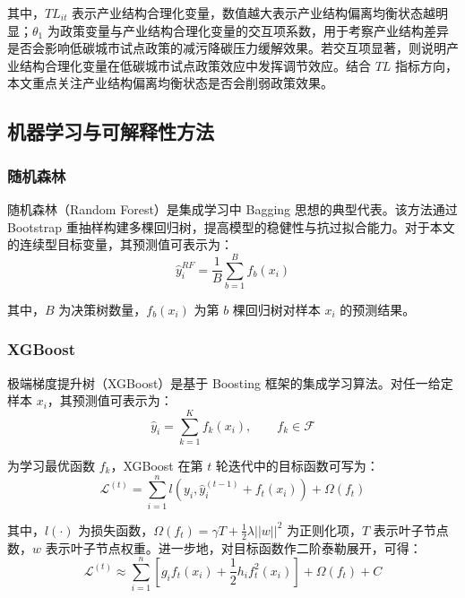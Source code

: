 \documentclass[12pt,a4paper]{ctexart}
\begin{document}
其中，$TL_{it}$ 表示产业结构合理化变量，数值越大表示产业结构偏离均衡状态越明显；$\theta_1$ 为政策变量与产业结构合理化变量的交互项系数，用于考察产业结构差异是否会影响低碳城市试点政策的减污降碳压力缓解效果。若交互项显著，则说明产业结构合理化变量在低碳城市试点政策效应中发挥调节效应。结合 $TL$ 指标方向，本文重点关注产业结构偏离均衡状态是否会削弱政策效果。

\subsection{机器学习与可解释性方法}

\subsubsection{随机森林}

随机森林（Random Forest）是集成学习中 Bagging 思想的典型代表。该方法通过 Bootstrap 重抽样构建多棵回归树，提高模型的稳健性与抗过拟合能力。对于本文的连续型目标变量，其预测值可表示为：
\begin{equation}
\hat{y}_i^{RF}=\frac{1}{B}\sum_{b=1}^{B}f_b(x_i)
\end{equation}

其中，$B$ 为决策树数量，$f_b(x_i)$ 为第 $b$ 棵回归树对样本 $x_i$ 的预测结果。

\subsubsection{XGBoost}

极端梯度提升树（XGBoost）是基于 Boosting 框架的集成学习算法。对任一给定样本 $x_i$，其预测值可表示为：
\begin{equation}
\hat{y}_i=\sum_{k=1}^{K}f_k(x_i), \qquad f_k \in \mathcal{F}
\end{equation}

为学习最优函数 $f_k$，XGBoost 在第 $t$ 轮迭代中的目标函数可写为：
\begin{equation}
\mathcal{L}^{(t)}=\sum_{i=1}^{n}l\left(y_i,\hat{y}_i^{(t-1)}+f_t(x_i)\right)+\Omega(f_t)
\end{equation}

其中，$l(\cdot)$ 为损失函数，$\Omega(f_t)=\gamma T+\frac{1}{2}\lambda ||w||^2$ 为正则化项，$T$ 表示叶子节点数，$w$ 表示叶子节点权重。进一步地，对目标函数作二阶泰勒展开，可得：
\begin{equation}
\mathcal{L}^{(t)} \approx \sum_{i=1}^{n}\left[g_i f_t(x_i)+\frac{1}{2}h_i f_t^2(x_i)\right]+\Omega(f_t)+C
\end{equation}
\end{document}
